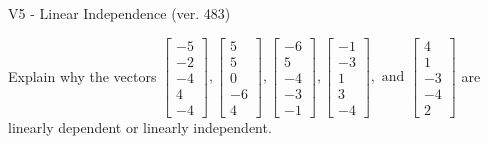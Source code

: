 \begin{exercise}
  \begin{exerciseTitle}V5 - Linear Independence (ver. 483)\end{exerciseTitle}
  \begin{exerciseStatement}
    Explain why the vectors \(\left[\begin{array}{r}
-5 \\
-2 \\
-4 \\
4 \\
-4
\end{array}\right] , \left[\begin{array}{r}
5 \\
5 \\
0 \\
-6 \\
4
\end{array}\right] , \left[\begin{array}{r}
-6 \\
5 \\
-4 \\
-3 \\
-1
\end{array}\right] , \left[\begin{array}{r}
-1 \\
-3 \\
1 \\
3 \\
-4
\end{array}\right] , \text{ and } \left[\begin{array}{r}
4 \\
1 \\
-3 \\
-4 \\
2
\end{array}\right]\) are linearly dependent or linearly independent.	



\end{exerciseStatement}
\end{exercise}
